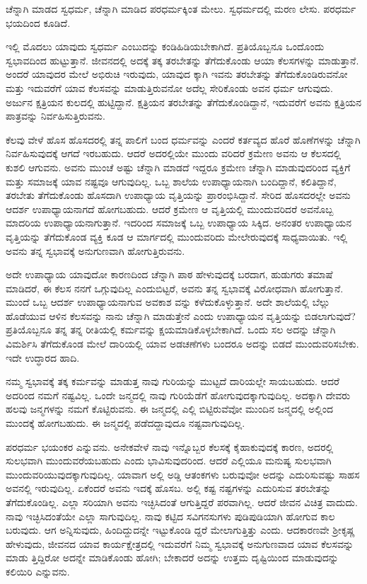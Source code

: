 {\small ಚೆನ್ನಾಗಿ ಮಾಡದ ಸ್ವಧರ್ಮ, ಚೆನ್ನಾಗಿ ಮಾಡಿದ ಪರಧರ್ಮಕ್ಕಿಂತ ಮೇಲು. ಸ್ವಧರ್ಮದಲ್ಲಿ ಮರಣ ಲೇಸು. ಪರಧರ್ಮ ಭಯದಿಂದ ಕೂಡಿದೆ.}

ಇಲ್ಲಿ ಮೊದಲು ಯಾವುದು ಸ್ವಧರ್ಮ ಎಂಬುದನ್ನು ಕಂಡಿಹಿಡಿಯಬೇಕಾಗಿದೆ. ಪ್ರತಿಯೊಬ್ಬನೂ ಒಂದೊಂದು ಸ್ವಭಾವದಿಂದ ಹುಟ್ಟುತ್ತಾನೆ. ಜೀವನದಲ್ಲಿ ಅದಕ್ಕೆ ತಕ್ಕ ತರಬೇತನ್ನು ತೆಗೆದುಕೊಂಡು ಆಯಾ ಕೆಲಸಗಳನ್ನು ಮಾಡುತ್ತಾನೆ. ಅಂದರೆ ಯಾವುದರ ಮೇಲೆ ಅಭಿರುಚಿ ಇರುವುದು, ಯಾವುದ ಕ್ಕಾಗಿ ಇವನು ತರಬೇತನ್ನು ತೆಗೆದುಕೊಂಡಿರುವನೋ ಮತ್ತು ಇದುವರೆಗೆ ಯಾವ ಕೆಲಸವನ್ನು ಮಾಡುತ್ತಿರುವನೋ ಅದೆಲ್ಲ ಸೇರಿಕೊಂಡು ಅವನ ಧರ್ಮ ಆಗುವುದು. ಅರ್ಜುನ ಕ್ಷತ್ರಿಯನ ಕುಲದಲ್ಲಿ ಹುಟ್ಟಿದ್ದಾನೆ. ಕ್ಷತ್ರಿಯನ ತರಬೇತನ್ನು ತೆಗೆದುಕೊಂಡಿದ್ದಾನೆ, ಇದುವರೆಗೆ ಅವನು ಕ್ಷತ್ರಿಯನ ಪಾತ್ರವನ್ನು ನಿರ್ವಹಿಸುತ್ತಿರುವನು.

ಕೆಲವು ವೇಳೆ ಹೊಸ ಹೊಸದರಲ್ಲಿ ತನ್ನ ಪಾಲಿಗೆ ಬಂದ ಧರ್ಮವನ್ನು ಎಂದರೆ ಕರ್ತವ್ಯದ ಹೊರೆ ಹೊಣೆಗಳನ್ನು ಚೆನ್ನಾಗಿ ನಿರ್ವಹಿಸುವುದಕ್ಕೆ ಆಗದೆ ಇರಬಹುದು. ಆದರೆ ಅದರಲ್ಲಿಯೇ ಮುಂದು ವರಿದರೆ ಕ್ರಮೇಣ ಅವನು ಆ ಕೆಲಸದಲ್ಲಿ ಕುಶಲಿ ಆಗುವನು. ಅವನು ಮುಂಚೆ ಅಷ್ಟು ಚೆನ್ನಾಗಿ ಮಾಡದೆ ಇದ್ದರೂ ಕ್ರಮೇಣ ಚೆನ್ನಾಗಿ ಮಾಡುವುದರಿಂದ ವ್ಯಕ್ತಿಗೆ ಮತ್ತು ಸಮಾಜಕ್ಕೆ ಯಾವ ನಷ್ಟವೂ ಆಗುವುದಿಲ್ಲ. ಒಬ್ಬ ಶಾಲೆಯ ಉಪಾಧ್ಯಾಯನಾಗಿ ಬಂದಿದ್ದಾನೆ, ಕಲಿತಿದ್ದಾನೆ, ತರಬೇತು ತೆಗೆದುಕೊಂಡು ಹೊಸದಾಗಿ ಉಪಾಧ್ಯಾಯ ವೃತ್ತಿಯನ್ನು ಪ್ರಾರಂಭಿಸಿದ್ದಾನೆ. ಸೇರಿದ ಹೊಸದರಲ್ಲೇ ಅವನು ಆದರ್ಶ ಉಪಾಧ್ಯಾಯನಾಗದೆ ಹೋಗಬಹುದು. ಆದರೆ ಕ್ರಮೇಣ ಆ ವೃತ್ತಿಯಲ್ಲಿ ಮುಂದುವರಿದರೆ ಅವನೊಬ್ಬ ಮಾದರಿಯ ಉಪಾಧ್ಯಾಯನಾಗುತ್ತಾನೆ. ಇದರಿಂದ ಸಮಾಜಕ್ಕೆ ಒಬ್ಬ ಉಪಾಧ್ಯಾಯ ಸಿಕ್ಕಿದ. ಅನಂತರ ಉಪಾಧ್ಯಾಯನ ವೃತ್ತಿಯನ್ನು ತೆಗೆದುಕೊಂಡ ವ್ಯಕ್ತಿ ಕೂಡ ಆ ಮಾರ್ಗದಲ್ಲಿ ಮುಂದುವರಿದು ಮೇಲೇರುವುದಕ್ಕೆ ಸಾಧ್ಯವಾಯಿತು. ಇಲ್ಲಿ ಅವನು ತನ್ನ ಸ್ವಭಾವಕ್ಕೆ ಅನುಗುಣವಾಗಿ ಹೋಗುತ್ತಿರುವನು.

ಅದೇ ಉಪಾಧ್ಯಾಯ ಯಾವುದೋ ಕಾರಣದಿಂದ ಚೆನ್ನಾಗಿ ಪಾಠ ಹೇಳುವುದಕ್ಕೆ ಬರದಾಗ, ಹುಡುಗರು ತಮಾಷೆ ಮಾಡಿದರೆ, ಈ ಕೆಲಸ ನನಗೆ ಒಗ್ಗುವುದಿಲ್ಲ ಎಂದುಬಿಟ್ಟರೆ, ಅವನು ತನ್ನ ಸ್ವಭಾವಕ್ಕೆ ವಿರೋಧವಾಗಿ ಹೋಗುತ್ತಾನೆ. ಮುಂದೆ ಒಬ್ಬ ಆದರ್ಶ ಉಪಾಧ್ಯಾಯನಾಗುವ ಅವಕಾಶ ವನ್ನು ಕಳೆದುಕೊಳ್ಳುತ್ತಾನೆ. ಅದೇ ಶಾಲೆಯಲ್ಲಿ ಬೆಲ್ಲು ಹೊಡೆಯುವ ಆಳಿನ ಕೆಲಸವನ್ನು ನಾನು ಚೆನ್ನಾಗಿ ಮಾಡುತ್ತೇನೆ ಎಂದು ಉಪಾಧ್ಯಾಯನ ವೃತ್ತಿಯನ್ನು ಬಿಡಲಾಗುವುದೆ? ಪ್ರತಿಯೊಬ್ಬನೂ ತನ್ನ ತನ್ನ ರೀತಿಯಲ್ಲಿ ಕರ್ಮವನ್ನು ಕ್ಷಯಮಾಡಿಕೊಳ್ಳಬೇಕಾಗಿದೆ. ಒಂದು ಸಲ ಅದನ್ನು ಚೆನ್ನಾಗಿ ವಿಮರ್ಶಿಸಿ ತೆಗೆದುಕೊಂಡ ಮೇಲೆ ದಾರಿಯಲ್ಲಿ ಯಾವ ಅಡಚಣೆಗಳು ಬಂದರೂ ಅದನ್ನು ಬಿಡದೆ ಮುಂದುವರಿಸಬೇಕು. ಇದೇ ಉದ್ಧಾರದ ಹಾದಿ.

ನಮ್ಮ ಸ್ವಭಾವಕ್ಕೆ ತಕ್ಕ ಕರ್ಮವನ್ನು ಮಾಡುತ್ತ ನಾವು ಗುರಿಯನ್ನು ಮುಟ್ಟದೆ ದಾರಿಯಲ್ಲೇ ಸಾಯಬಹುದು. ಆದರೆ ಅದರಿಂದ ನಮಗೆ ನಷ್ಟವಿಲ್ಲ. ಒಂದೇ ಜನ್ಮದಲ್ಲಿ ನಾವು ಗುರಿಯೆಡೆಗೆ ಹೋಗುವುದಕ್ಕಾಗುವುದಿಲ್ಲ. ಅದಕ್ಕಾಗಿ ದೇವರು ಹಲವು ಜನ್ಮಗಳನ್ನು ನಮಗೆ ಕೊಟ್ಟಿರುವನು. ಈ ಜನ್ಮದಲ್ಲಿ ಎಲ್ಲಿ ಬಿಟ್ಟಿರುವೆವೋ ಮುಂದಿನ ಜನ್ಮದಲ್ಲಿ ಅಲ್ಲಿಂದ ಮುಂದಕ್ಕೆ ಹೋಗಬಹುದು. ಈ ಜನ್ಮದಲ್ಲಿ ಪಡೆದದ್ದಾವುದೂ ನಷ್ಟವಾಗುವುದಿಲ್ಲ.

ಪರಧರ್ಮ ಭಯಂಕರ ಎನ್ನುವನು. ಅನೇಕವೇಳೆ ನಾವು ಇನ್ನೊಬ್ಬರ ಕೆಲಸಕ್ಕೆ ಕೈಹಾಕುವುದಕ್ಕೆ ಕಾರಣ, ಅದರಲ್ಲಿ ಸುಲಭವಾಗಿ ಮುಂದುವರೆಯಬಹುದು ಎಂದು ಭಾವಿಸುವುದರಿಂದ. ಆದರೆ ಎಲ್ಲಿಯೂ ಮನುಷ್ಯ ಸುಲಭವಾಗಿ ಮುಂದುವರಿಯುವುದಕ್ಕಾಗುವುದಿಲ್ಲ. ಯಾವಾಗ ಅಲ್ಲಿ ಅಡ್ಡಿ ಆತಂಕಗಳು ಬರುವುವೋ ಅದನ್ನು ಎದುರಿಸುವಷ್ಟು ಸಾಹಸ ಅವನಲ್ಲಿ ಇರುವುದಿಲ್ಲ. ಏಕೆಂದರೆ ಅವನು ಇದಕ್ಕೆ ಹೊಸಬ. ಅಲ್ಲಿ ಕಷ್ಟ ನಷ್ಟಗಳನ್ನು ಎದುರಿಸುವ ತರಬೇತನ್ನು ತೆಗೆದುಕೊಂಡಿಲ್ಲ. ಎಲ್ಲಾ ಸರಿಯಾಗಿ ಅವನು ಇಚ್ಛಿಸಿದಂತೆ ಆಗುತ್ತಿದ್ದರೆ ಪರವಾಗಿಲ್ಲ. ಆದರೆ ಜೀವನ ವಿಚಿತ್ರ ವಾದುದು. ನಾವು ಇಚ್ಛಿಸಿದಂತೆಯೇ ಎಲ್ಲಾ ಸಾಗುವುದಿಲ್ಲ. ನಾವು ಕಟ್ಟಿದ ಸವಿಗನಸುಗಳು ಪುಡಿಪುಡಿಯಾಗಿ ಹೋಗುವ ಕಾಲ ಬರುವುದು. ಆಗ ಅನ್ನಿಸುವುದು, ಹಿಂದಿದ್ದುದನ್ನೇ ಇಟ್ಟುಕೊಂಡಿ ದ್ದರೆ ಮೇಲಾಗುತ್ತಿತ್ತು ಎಂದು. ಆದಕಾರಣವೇ ಶ‍್ರೀಕೃಷ್ಣ ಹೇಳುವುದು, ಜೀವನದ ಯಾವ ಕಾರ್ಯಕ್ಷೇತ್ರದಲ್ಲಿ ಇದುವರೆಗೆ ನಿಮ್ಮ ಸ್ವಭಾವಕ್ಕೆ ಅನುಗುಣವಾದ ಯಾವ ಕೆಲಸವನ್ನು ಮಾಡು ತ್ತಿದ್ದಿರೋ ಅದನ್ನೇ ಮಾಡಿಕೊಂಡು ಹೋಗಿ; ಬೇಕಾದರೆ ಅದನ್ನು ಉತ್ತಮ ದೃಷ್ಟಿಯಿಂದ ಮಾಡುವುದನ್ನು ಕಲಿಯಿರಿ ಎನ್ನುವನು.

